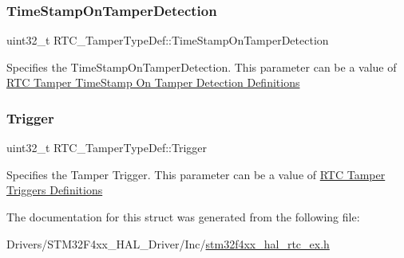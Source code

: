 \subsubsection{\texorpdfstring{Time\+Stamp\+On\+Tamper\+Detection}{TimeStampOnTamperDetection}}
{\footnotesize\ttfamily uint32\+\_\+t R\+T\+C\+\_\+\+Tamper\+Type\+Def\+::\+Time\+Stamp\+On\+Tamper\+Detection}

Specifies the Time\+Stamp\+On\+Tamper\+Detection. This parameter can be a value of \hyperlink{group___r_t_c_ex___tamper___time_stamp_on_tamper_detection___definitions}{R\+TC Tamper Time\+Stamp On Tamper Detection Definitions} \mbox{\label{struct_r_t_c___tamper_type_def_a0266f7aca365a9cf468cc2571d9f9395}} 
\subsubsection{\texorpdfstring{Trigger}{Trigger}}
{\footnotesize\ttfamily uint32\+\_\+t R\+T\+C\+\_\+\+Tamper\+Type\+Def\+::\+Trigger}

Specifies the Tamper Trigger. This parameter can be a value of \hyperlink{group___r_t_c_ex___tamper___trigger___definitions}{R\+TC Tamper Triggers Definitions} 

The documentation for this struct was generated from the following file\+:\begin{DoxyCompactItemize}
\item 
Drivers/\+S\+T\+M32\+F4xx\+\_\+\+H\+A\+L\+\_\+\+Driver/\+Inc/\hyperlink{stm32f4xx__hal__rtc__ex_8h}{stm32f4xx\+\_\+hal\+\_\+rtc\+\_\+ex.\+h}\end{DoxyCompactItemize}
